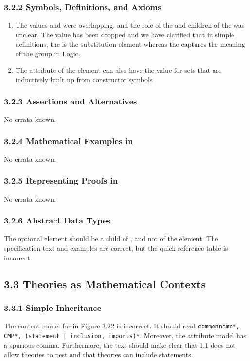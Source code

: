 \subsubsection*{3.2.2 Symbols, Definitions, and Axioms}
\begin{enumerate}
\item The values {} and
  {} were overlapping, and the role of the
  {} and {} children of the {} was
  unclear. The value {} has been dropped and we have
  clarified that in simple definitions, the {} is the substitution
  element whereas the {} captures the meaning of the {}
  group in Logic.
\item The attribute {} of the {} element
  can also have the value {} for sets that are
  inductively built up from constructor symbols
\end{enumerate}

\subsubsection*{3.2.3 Assertions and Alternatives}
No errata known.
\subsubsection*{3.2.4 Mathematical Examples in {\else{\omdoc}\fi}}
No errata known.
\subsubsection*{3.2.5 Representing Proofs in {\else{\omdoc}\fi}}
No errata known.
\subsubsection*{3.2.6 Abstract Data Types}
The optional {} element should be a child of
{}, and not of the {} element. The
specification text and examples are correct, but the quick reference table is
incorrect.

\subsection*{3.3 Theories as Mathematical Contexts}
\subsubsection*{3.3.1 Simple Inheritance}
The content model for {} in Figure 3.22 is incorrect. It should
read {\tt{commonname*, CMP*, ({\rm statement} | inclusion, imports)*}}. Moreover,
the attribute model has a spurious comma. Furthermore, the text should make clear
that {\omdoc}1.1 does not allow theories to nest and that theories can include
{} statements.

